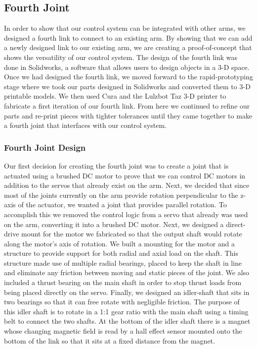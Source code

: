 \subsection{Fourth Joint}
In order to show that our control system can be integrated with other arms, we designed a fourth link to connect to an existing arm.  By showing that we can add a newly designed link to our existing arm, we are creating a proof-of-concept that shows the versatility of our control system.  The design of the fourth link was done in Solidworks, a software that allows users to design objects in a 3-D space.  Once we had designed the fourth link, we moved forward to the rapid-prototyping stage where we took our parts designed in Solidworks and converted them to 3-D printable models.  We then used Cura and the Lulzbot Taz 3-D printer to fabricate a first iteration of our fourth link.  From here we continued to refine our parts and re-print pieces with tighter tolerances until they came together to make a fourth joint that interfaces with our control system.  

\subsubsection{Fourth Joint Design}
Our first decision for creating the fourth joint was to create a joint that is actuated using a brushed DC motor to prove that we can control DC motors in addition to the servos that already exist on the arm.  Next, we decided that since most of the joints currently on the arm provide rotation perpendicular to the z-axis of the actuator, we wanted a joint that provides parallel rotation.  To accomplish this we removed the control logic from a servo that already was used on the arm, converting it into a brushed DC motor.  Next, we designed a direct-drive mount for the motor we fabricated so that the output shaft would rotate along the motor's axis of rotation.  We built a mounting for the motor and a structure to provide support for both radial and axial load on the shaft.  This structure made use of multiple radial bearings, placed to keep the shaft in line and eliminate any friction between moving and static pieces of the joint.  We also included a thrust bearing on the main shaft in order to stop thrust loads from being placed directly on the servo.  Finally, we designed an idler-shaft that sits in two bearings so that it can free rotate with negligible friction.  The purpose of this idler shaft is to rotate in a 1:1 gear ratio with the main shaft using a timing belt to connect the two shafts.  At the bottom of the idler shaft there is a magnet whose changing magnetic field is read by a hall effect sensor mounted onto the bottom of the link so that it sits at a fixed distance from the magnet.  

